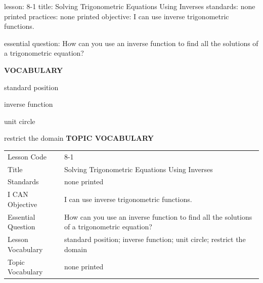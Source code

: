 \documentclass{article}
\newenvironment{lesson-meta}{}{}        %
\newcommand{\te}[1]{}                   %
\begin{document}
\begin{lesson-meta}
lesson: 8-1
title: Solving Trigonometric Equations Using Inverses
standards: none printed
practices: none printed
objective: I can use inverse trigonometric functions.

essential question: How can you use an inverse function to find all the solutions of a trigonometric equation?

\textbf{VOCABULARY}
\item standard position
\item inverse function
\item unit circle
\item restrict the domain
\textbf{TOPIC VOCABULARY}
\te{No separate topic vocabulary list is printed on these lesson pages.}
\begin{tabular}{ll}
Lesson Code & 8-1 \\
Title & Solving Trigonometric Equations Using Inverses \\
Standards & none printed \\
I CAN Objective & I can use inverse trigonometric functions. \\
Essential Question & How can you use an inverse function to find all the solutions of a trigonometric equation? \\
Lesson Vocabulary & standard position; inverse function; unit circle; restrict the domain \\
Topic Vocabulary & none printed \\
\end{tabular}
\end{lesson-meta}
\end{document}
